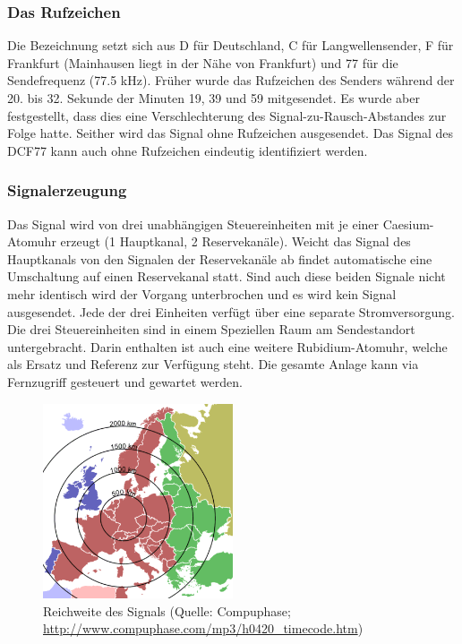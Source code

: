 \subsubsection{Das Rufzeichen}
Die Bezeichnung setzt sich aus D für Deutschland, C für Langwellensender, F für Frankfurt (Mainhausen liegt in der Nähe von Frankfurt) und 77 für die Sendefrequenz (77.5 kHz). Früher wurde das Rufzeichen des Senders während der 20. bis 32. Sekunde der Minuten 19, 39 und 59 mitgesendet. Es wurde aber festgestellt, dass dies eine Verschlechterung des Signal-zu-Rausch-Abstandes zur Folge hatte. Seither wird das Signal ohne Rufzeichen ausgesendet. Das Signal des DCF77 kann auch ohne Rufzeichen eindeutig identifiziert werden.

\subsubsection{Signalerzeugung}
Das Signal wird von drei unabhängigen Steuereinheiten mit je einer Caesium-Atomuhr erzeugt (1 Hauptkanal, 2 Reservekanäle). Weicht das Signal des Hauptkanals von den Signalen der Reservekanäle ab findet automatische eine Umschaltung auf einen Reservekanal statt. Sind auch diese beiden Signale nicht mehr identisch wird der Vorgang unterbrochen und es wird kein Signal ausgesendet. Jede der drei Einheiten verfügt über eine separate Stromversorgung. Die drei Steuereinheiten sind in einem Speziellen Raum am Sendestandort untergebracht. Darin enthalten ist auch eine weitere Rubidium-Atomuhr, welche als Ersatz und Referenz zur Verfügung steht. Die gesamte Anlage kann via Fernzugriff gesteuert und gewartet werden. 
 

\begin{figure}
  \centering
    \includegraphics[width=0.5\textwidth]{./images/Analyse/DCF77_Reichweite.png}
  \caption[Reichweite des Signals]{Reichweite des Signals (Quelle: Compuphase; 
  \url{http://www.compuphase.com/mp3/h0420_timecode.htm})} 
\end{figure}

